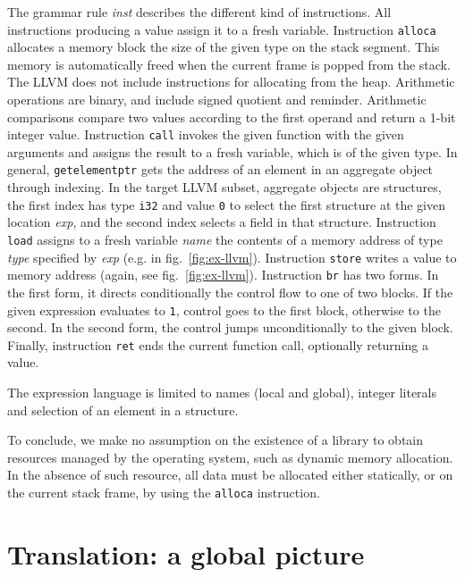 \documentclass{llncs}
\newcommand{\llvm}[1]{\texttt{#1}}
\newcommand{\nt}[1]{{\normalfont\textit{#1}}}
\begin{document}
The grammar rule \nt{inst} describes the different kind of instructions. All
instructions producing a value assign it to a fresh variable.  Instruction
\llvm{alloca} allocates a memory block the size of the given type on the stack
segment. This memory is automatically freed when the current frame is popped
from the stack. The LLVM does not include instructions for allocating from the
heap. Arithmetic operations are binary, and include signed quotient and
reminder. Arithmetic comparisons compare two values according to the first
operand and return a 1-bit integer value.  Instruction \llvm{call} invokes the
given function with the given arguments and assigns the result to a fresh
variable, which is of the given type.  In general, \llvm{getelementptr} gets the
address of an element in an aggregate object through indexing. In the target
LLVM subset, aggregate objects are structures, the first index has type
\llvm{i32} and value \llvm{0} to select the first structure at the given
location \nt{exp}, and the second index selects a field in that structure.
Instruction \llvm{load} assigns to a fresh variable \nt{name} the contents of a
memory address of type \nt{type} specified by \nt{exp} (e.g. in
fig.~\ref{fig:ex-llvm}).  Instruction \llvm{store} writes a value to memory
address (again, see fig.~\ref{fig:ex-llvm}).  Instruction \llvm{br} has two
forms.  In the first form, it directs conditionally the control flow to one of
two blocks.  If the given expression evaluates to \llvm{1}, control goes to the
first block, otherwise to the second. In the second form, the control jumps
unconditionally to the given block.
Finally, instruction \llvm{ret}
ends the current function call, optionally returning a value.

The expression language is limited to names (local and global), integer literals
and selection of an element in a structure.

To conclude, we make no assumption on the existence of a library to obtain
resources managed by the operating system, such as dynamic memory allocation. In
the absence of such resource, all data must be allocated either statically, or
on the current stack frame, by using the \llvm{alloca} instruction.

\section{Translation: a global picture}
\label{sec:overview}
\end{document}
